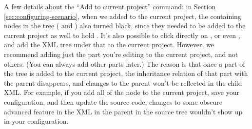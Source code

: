 A few details about the ``Add to current project'' command: in Section
\ref{sec:configuring-scenario}, when we added  to the
current project, the containing nodes in the tree ( and
) also turned black, since they needed to be added to
the current project as well to hold .  It's also possible to
click directly on , or even , and
add the XML tree under that to the current project.  However, we recommend
adding just the part you're editing to the current project, and not others.
(You can always add other parts later.)  The reason is that once a part of
the tree is added to the current project, the inheritance relation of that
part with the parent disappears, and changes to the parent won't be
reflected in the child XML\@.  For example, if you add all of the
 node to the current project, save your
configuration, and then update the source code, changes to some obscure
advanced feature in the XML in the parent in the source tree wouldn't show
up in your configuration.
